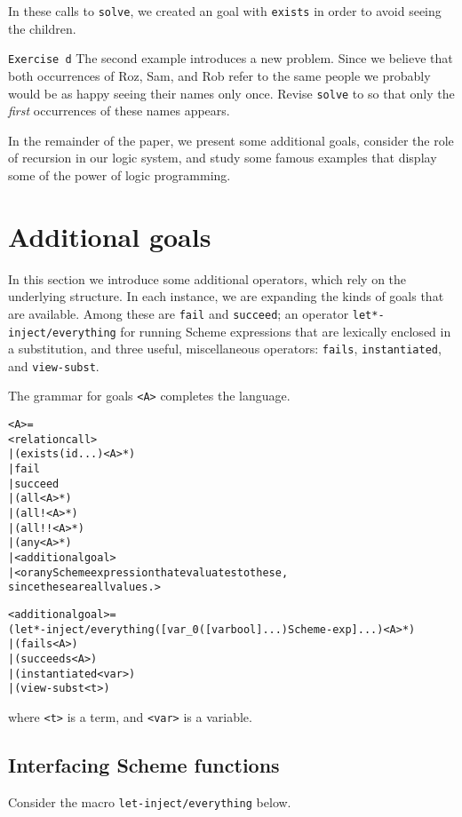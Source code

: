 \noindent
In these calls to \texttt{solve}, we created an goal with
\texttt{exists} in order to avoid seeing the children.

\texttt{Exercise d} The second example introduces a new problem.
Since we believe that both occurrences of Roz, Sam, and Rob refer to
the same people we probably would be as happy seeing their names only
once.  Revise \texttt{solve} to so that only the \emph{first} occurrences of
these names appears.\endofexercise{}

In the remainder of the paper, we present some additional goals,
consider the role of recursion in our logic system, and study some
famous examples that display some of the power of logic programming.

\section{Additional goals}

In this section we introduce some additional operators, which rely on
the underlying structure.  In each instance, we are expanding the
kinds of goals that are available.  Among these are
\texttt{fail} and \texttt{succeed}; an operator
\texttt{let*-inject/everything} for running Scheme expressions that
are lexically enclosed in a substitution, and three useful,
miscellaneous operators: \texttt{fails}, \texttt{instantiated}, and
\texttt{view-subst}.

The grammar for goals \texttt{<A>} completes the language.
\begin{alltt}
<A> =
     <relation call>
   | (exists (id ...) <A>*)
   | fail
   | succeed
   | (all <A>*)
   | (all! <A>*)
   | (all!! <A>*)
   | (any <A>*)
   | <additional goal>
   | <or any Scheme expression that evaluates to these,
       since these are all values.>

<additional goal> =
     (let*-inject/everything ([var_0 ([var bool] ...) Scheme-exp] ...) <A>*)
   | (fails <A>)
   | (succeeds <A>)
   | (instantiated <var>)
   | (view-subst <t>)
\end{alltt}

\noindent
where \texttt{<t>} is a term, and \texttt{<var>} is a variable.

\subsection{Interfacing Scheme functions}

Consider the macro \texttt{let-inject/everything} below.

